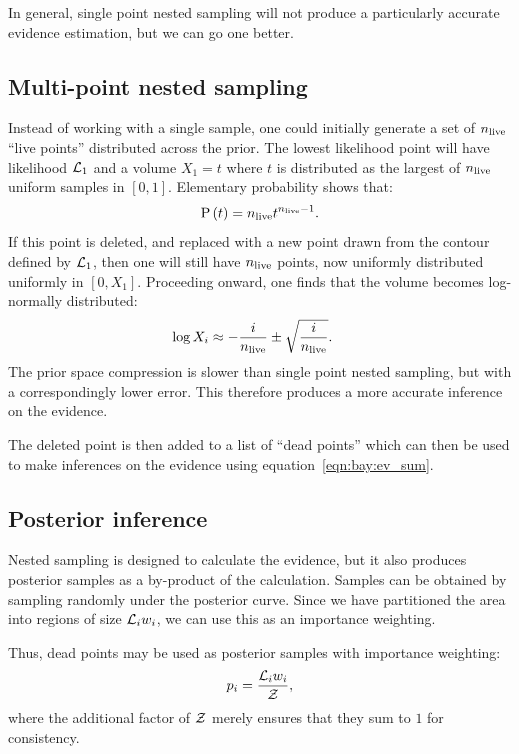 In general, single point nested sampling will not produce a particularly accurate evidence estimation, but we can go one better.


\subsection{Multi-point nested sampling}
Instead of working with a single sample, one could initially generate a set of \(n_{\mathrm{live}}\) ``live points'' distributed across the prior. The lowest likelihood point will have likelihood \(\mathcal{L}_1\) and a volume \(X_1 = t\) where \(t\) is distributed as the largest of \(n_{\mathrm{live}}\) uniform samples in \([0,1]\). Elementary probability shows that:
\begin{equation}
  \mathrm{P}\left(t\right) = n_{\mathrm{live}} t^{n_{\mathrm{live}}-1}.
  \label{eqn:bay:t_prob}
\end{equation}
If this point is deleted, and replaced with a new point drawn from the contour defined by \(\mathcal{L}_1\), then one will still have \(n_{\mathrm{live}}\) points, now uniformly distributed uniformly in \([0,X_1]\). Proceeding onward, one finds that the volume becomes log-normally distributed:
\begin{align}
  \log X_i  &\approx -\frac{i}{n_{\mathrm{live}}} \pm \sqrt{\frac{i}{n_{\mathrm{live}}}}.
  \label{eqn:pc:X_full}
\end{align}
The prior space compression is slower than single point nested sampling, but with a correspondingly lower error. This therefore produces a more accurate inference on the evidence.

The deleted point is then added to a list of ``dead points'' which can then be used to make inferences on the evidence using equation~\eqref{eqn:bay:ev_sum}.


\subsection{Posterior inference}
Nested sampling is designed to calculate the evidence, but it also produces posterior samples as a by-product of the calculation. Samples can be obtained by sampling randomly under the posterior curve.
Since we have partitioned the area into regions of size \(\mathcal{L}_i w_i\), we can use this as an importance weighting.

Thus, dead points may be used as posterior samples with importance weighting:
\begin{equation}
  p_i = \frac{\mathcal{L}_i w_i}{\mathcal{Z}},
  \label{eqn:bay:posterior_weight}
\end{equation}
where the additional factor of \(\mathcal{Z}\) merely ensures that they sum to \(1\) for consistency.



